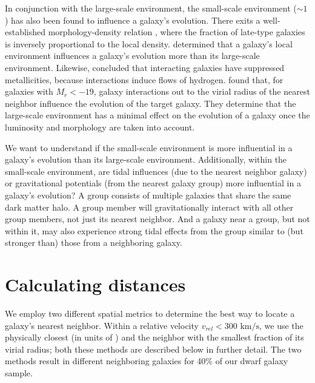 In conjunction with the large-scale environment, the small-scale environment 
($\sim 1$ \hMpc) has also been found to influence a galaxy's evolution.  There 
exits a well-established morphology-density relation \cite{Dressler80}, where 
the fraction of late-type galaxies is inversely proportional to the local 
density.  \cite{Ellison09} determined that a galaxy's local environment 
influences a galaxy's evolution more than its large-scale environment.  
Likewise, \cite{Rupke08} concluded that interacting galaxies have suppressed 
metallicities, because interactions induce flows of hydrogen.  \cite{Park09} 
found that, for galaxies with $M_r < -19$, galaxy interactions out to the virial 
radius of the nearest neighbor influence the evolution of the target galaxy.  
They determine that the large-scale environment has a minimal effect on the 
evolution of a galaxy once the luminosity and morphology are taken into account.

We want to understand if the small-scale environment is more influential in a 
galaxy's evolution than its large-scale environment.  Additionally, within the 
small-scale environment, are tidal influences (due to the nearest neighbor 
galaxy) or gravitational potentials (from the nearest galaxy group) more 
influential in a galaxy's evolution?  A group consists of multiple galaxies that 
share the same dark matter halo.  A group member will gravitationally interact 
with all other group members, not just its nearest neighbor.  And a galaxy near 
a group, but not within it, may also experience strong tidal effects from the 
group similar to (but stronger than) those from a neighboring galaxy.





\section[Theory]{Calculating distances}\label{sec:Theory_dist}

We employ two different spatial metrics to determine the best way to locate a 
galaxy's nearest neighbor.  Within a relative velocity 
$v_{rel} < 300\text{ km/s}$, we use the physically closest (in units of \hMpc) 
and the neighbor with the smallest fraction of its virial radius; both these 
methods are described below in further detail.  The two methods result in 
different neighboring galaxies for 40\% of our dwarf galaxy sample.


